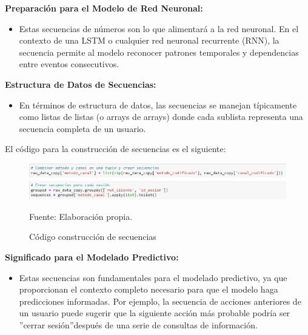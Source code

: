 \textbf{Preparación para el Modelo de Red Neuronal:}

\begin{itemize}
    \item Estas secuencias de números son lo que alimentará a la red neuronal. En el contexto de una LSTM o cualquier red neuronal recurrente (RNN), la secuencia permite al modelo reconocer patrones temporales y dependencias entre eventos consecutivos.
\end{itemize}

\textbf{Estructura de Datos de Secuencias:}

\begin{itemize}
    \item En términos de estructura de datos, las secuencias se manejan típicamente como listas de listas (o arrays de arrays) donde cada sublista representa una secuencia completa de un usuario.
\end{itemize}

El código para la construcción de secuencias es el siguiente:

\begin{figure}[H]
    \begin{minipage}[t]{0.9\textwidth}
        \caption{Código construcción de secuencias}
        \label{construcción_secuencias}        
    \end{minipage}

    \vspace{10pt}

    \begin{minipage}[b]{1\textwidth}
        \centering
        \includegraphics[width=\textwidth]{img/Código construcción de secuencias.jpg}        
    \end{minipage}

    \begin{minipage}[t]{0.9\textwidth}
        Fuente: Elaboración propia.
    \end{minipage}
\end{figure}

\textbf{Significado para el Modelado Predictivo:}

\begin{itemize}
    \item Estas secuencias son fundamentales para el modelado predictivo, ya que proporcionan el contexto completo necesario para que el modelo haga predicciones informadas. Por ejemplo, la secuencia de acciones anteriores de un usuario puede sugerir que la siguiente acción más probable podría ser \textquotedblright cerrar sesión\textquotedblright después de una serie de consultas de información.
\end{itemize}

